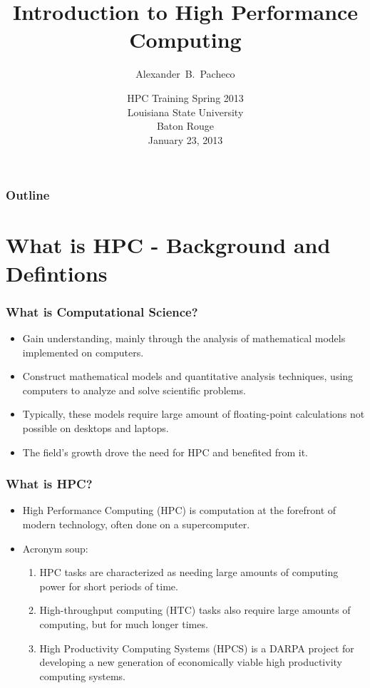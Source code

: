 \documentclass[slidestop,mathserif,compress,xcolor=svgnames,table]{beamer}
\title{Introduction to High Performance Computing}
\author[Alex Pacheco]{\large{Alexander~B.~Pacheco}}
\institute[HPC Training: Spring 2013] {\inst{}\footnotesize{User Services Consultant\\LSU HPC \& LONI\\sys-help@loni.org}}
\date[\hfill{January 23, 2012\hspace{2cm}\insertframenumber/\inserttotalframenumber}]{\scriptsize{HPC Training Spring 2013\\Louisiana State University\\Baton Rouge\\January 23, 2013}}
\begin{document}
\frame{\titlepage}

\normalsize
\begin{frame}[label=toc,squeeze]
  \frametitle{\small{Outline}}
  \tableofcontents
\end{frame}

\section{What is HPC - Background and Defintions}
\begin{frame}
  \frametitle{\small What is Computational Science?}
  \begin{itemize}
    \item Gain understanding, mainly through the analysis of mathematical models implemented on computers.
    \item Construct mathematical models and quantitative analysis techniques, using computers to analyze and solve scientific problems.
    \item Typically, these models require large amount of floating-point calculations not possible on desktops and laptops.
    \item The field's growth drove the need for HPC and benefited from it.
  \end{itemize}
\end{frame}

\begin{frame}
  \frametitle{\small What is HPC?}
  \begin{itemize}
    \item High Performance Computing (HPC) is computation at the forefront of modern technology, often done on a supercomputer. 
    \item Acronym soup:
    \begin{enumerate}
        \item HPC tasks are characterized as needing large amounts of computing power for short periods of time.
        \item High-throughput computing (HTC) tasks also require large amounts of computing, but for much longer times.
        \item High Productivity Computing Systems (HPCS) is a DARPA project for developing a new generation of economically viable high productivity computing systems.
    \end{enumerate}
  \end{itemize}
\end{frame}
\end{document}
